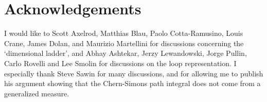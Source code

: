 \section*{Acknowledgements}

I would like to Scott Axelrod, Matthias Blau, Paolo Cotta-Ramusino,
Louis Crane, James Dolan, and Maurizio Martellini for discussions
concerning the `dimensional ladder', and Abhay Ashtekar, Jerzy
Lewandowski, Jorge Pullin, Carlo Rovelli and Lee Smolin for discussions
on the loop representation.  I especially thank Steve Sawin for many
discussions, and for allowing me to publish his argument showing that
the Chern-Simons path integral does not come from a generalized measure.

\newcommand{\cqg}[1]{{\em Class.\ Quan.\ Grav.\ }{\bf #1}}
\newcommand{\grg}[1]{{\em Gen.\ Rel.\ Grav.\ }{\bf #1}}
\newcommand{\pr}[1]{{\em Phys.\ Rev.\ }{\bf #1}}
\newcommand{\prl}[1]{{\em Phys.\ Rev.\ Lett.\ }{\bf #1}}
\newcommand{\pl}[1]{{\em Phys.\ Lett.\ }{\bf #1}}
\newcommand{\np}[1]{{\em Nucl.\ Phys.\ }{\bf #1}}
\newcommand{\jmp}[1]{{\em J. Math.\ Phys.\ }{\bf #1}}
\newcommand{\jgp}[1]{{\em J. Geom.\ Phys.\ }{\bf #1}}
\newcommand{\cmp}[1]{{\em Commun.\ Math.\ Phys.\ }{\bf #1}}
\newcommand{\mpl}[1]{{\em Mod.\ Phys.\ Lett.\ }{\bf #1}}
\newcommand{\ijmp}[1]{{\em Int.\ J. Mod.\ Phys.\ }{\bf #1}}


